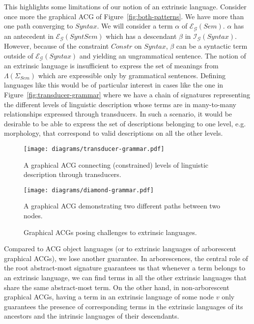 This highlights some limitations of our notion of an extrinsic
language. Consider once more the graphical ACG of
Figure~\ref{fig:both-patterns}. We have more than one path converging to
$Syntax$. We will consider a term $\alpha$ of
$\mathcal{E}_{\mathcal{G}}(Sem)$. $\alpha$ has an antecedent in
$\mathcal{E}_{\mathcal{G}}(SyntSem)$ which has a descendant $\beta$ in
$\mathcal{I}_{\mathcal{G}}(Syntax)$. However, because of the constraint
$Constr$ on $Syntax$, $\beta$ can be a syntactic term outside of
$\mathcal{E}_{\mathcal{G}}(Syntax)$ and yielding an ungrammatical
sentence. The notion of an extrinsic language is insufficient to express
the set of meanings from $\Lambda(\Sigma_{Sem})$ which are expressible
only by grammatical sentences. Defining languages like this would be of
particular interest in cases like the one in
Figure~\ref{fig:transducer-grammar} where we have a chain of signatures
representing the different levels of linguistic description whose terms
are in many-to-many relationships expressed through transducers. In such
a scenario, it would be desirable to be able to express the set of
descriptions belonging to one level, e.g. morphology, that correspond to
valid descriptions on all the other levels.

\begin{figure}[t]
  \centering
  \begin{minipage}[b]{0.4\textwidth}
    \centering
    \texttt{[image: diagrams/transducer-grammar.pdf]}
    \caption{{\label{fig:transducer-grammar} A graphical ACG connecting
        (constrained) levels of linguistic description through
        transducers.}}
  \end{minipage}
  \qquad
  \begin{minipage}[b]{0.4\textwidth}
    \centering
    \texttt{[image: diagrams/diamond-grammar.pdf]}
    \caption{{\label{fig:diamond-grammar} A graphical ACG demonstrating
        two different paths between two nodes.}}
  \end{minipage}
  \caption{Graphical ACGs posing challenges to extrinsic languages.}
\end{figure}

Compared to ACG object languages (or to extrinsic languages of
arborescent graphical ACGs), we lose another guarantee. In
arborescences, the central role of the root abstract-most signature
guarantees us that whenever a term belongs to an extrinsic language, we
can find terms in all the other extrinsic languages that share the same
abstract-most term. On the other hand, in non-arborescent graphical
ACGs, having a term in an extrinsic language of some node $v$ only
guarantees the presence of corresponding terms in the extrinsic
languages of its ancestors and the intrinsic languages of their
descendants.

